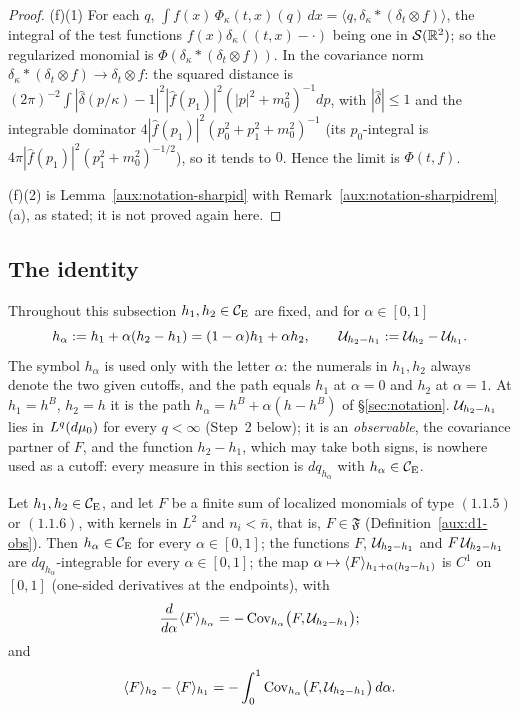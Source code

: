 \begin{proof}
(f)(1) For each $q$, $\int f(x)\,\Phi_\kappa(t,x)(q)\,dx=\langle q,\delta_\kappa*(\delta_t\otimes
f)\rangle$, the integral of the test functions $f(x)\delta_\kappa((t,x)-\cdot)$ being one in
$\mathcal S(\mathbb{R}^2)$; so the regularized monomial is $\Phi(\delta_\kappa*(\delta_t\otimes f))$.  In
the covariance norm $\delta_\kappa*(\delta_t\otimes f)\to\delta_t\otimes f$: the squared distance
is $(2\pi)^{-2}\int|\hat\delta(p/\kappa)-1|^2|\hat f(p_1)|^2(|p|^2+m_0^2)^{-1}dp$, with
$|\hat\delta|\le1$ and the integrable dominator $4|\hat f(p_1)|^2(p_0^2+p_1^2+m_0^2)^{-1}$
(its $p_0$-integral is $4\pi|\hat f(p_1)|^2(p_1^2+m_0^2)^{-1/2}$), so it tends to $0$.  Hence the
limit is $\Phi(t,f)$.

(f)(2) is Lemma~\ref{aux:notation-sharpid} with Remark~\ref{aux:notation-sharpidrem}(a), as
stated; it is not proved again here.
\end{proof}

\subsection*{The identity}

Throughout this subsection $h_1,h_2\in\mathcal{C}_{\mathrm E}$ are fixed, and for $\alpha\in[0,1]$
\[
 h_\alpha:=h_1+\alpha(h_2-h_1)=(1-\alpha)h_1+\alpha h_2,\qquad
 \mathcal U_{h_2-h_1}:=\mathcal U_{h_2}-\mathcal U_{h_1} .
\]
The symbol $h_\alpha$ is used only with the letter $\alpha$: the numerals in $h_1,h_2$ always
denote the two given cutoffs, and the path equals $h_1$ at $\alpha=0$ and $h_2$ at $\alpha=1$.
At $h_1=h^B$, $h_2=h$ it is the path $h_\alpha=h^B+\alpha(h-h^B)$ of \S\ref{sec:notation}.
$\mathcal U_{h_2-h_1}$ lies in $L^q(d\mu_0)$ for every $q<\infty$ (Step~2 below); it is an
\emph{observable}, the covariance partner of $F$, and the function $h_2-h_1$, which may take
both signs, is nowhere used as a cutoff: every measure in this section is $dq_{h_\alpha}$
with $h_\alpha\in\mathcal{C}_{\mathrm E}$.

\begin{dlemma}\label{lem:D1}
Let $h_1,h_2\in\mathcal{C}_{\mathrm E}$, and let $F$ be a finite sum of localized monomials of type $(1.1.5)$ or
$(1.1.6)$, with kernels in $L^2$ and $n_i<\bar n$, that is, $F\in\mathfrak F$
(Definition~\ref{aux:d1-obs}). Then $h_\alpha\in\mathcal{C}_{\mathrm E}$ for every $\alpha\in[0,1]$; the functions
$F$, $\mathcal U_{h_2-h_1}$ and $F\,\mathcal U_{h_2-h_1}$ are $dq_{h_\alpha}$-integrable for every
$\alpha\in[0,1]$; the map $\alpha\mapsto\langle F\rangle_{h_1+\alpha(h_2-h_1)}$ is $C^1$ on $[0,1]$
(one-sided derivatives at the endpoints), with
\begin{equation}\label{eq:d1-deriv}
 \frac{d}{d\alpha}\langle F\rangle_{h_\alpha}=-\operatorname{Cov}_{h_\alpha}\bigl(F,\mathcal U_{h_2-h_1}\bigr);
\end{equation}
and
\begin{equation}\label{eq:d1-identity}
 \langle F\rangle_{h_2}-\langle F\rangle_{h_1}=-\int_0^1\operatorname{Cov}_{h_\alpha}\bigl(F,\mathcal U_{h_2-h_1}\bigr)\,d\alpha .
\end{equation}
\end{dlemma}

